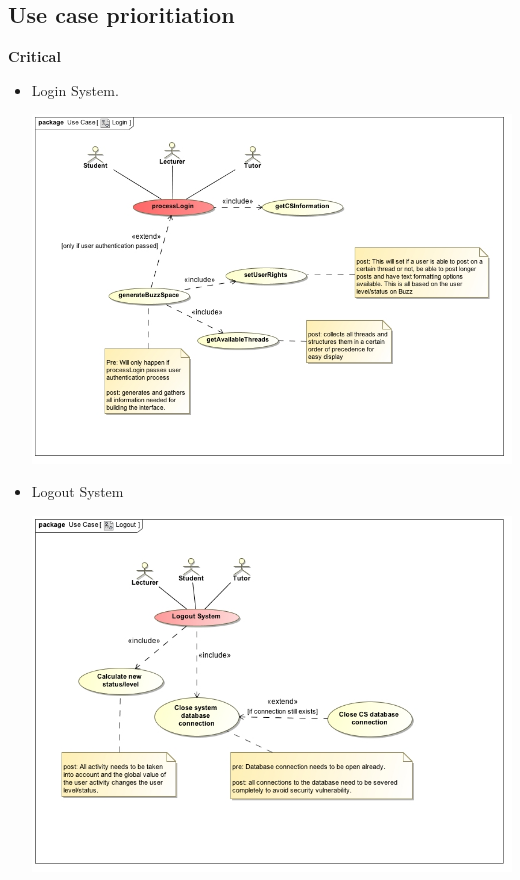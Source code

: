 \documentclass[a4paper,12pt]{report}
\begin{document}
\subsection{Use case prioritiation}
\textbf{Critical} 
\begin{itemize}
  \item Login System.
	\begin{center}
  	\includegraphics[width=1\textwidth]{../Functional_Requirements_DIagrams/UseCases/UseCase_Login.jpg}\\[0.4cm]    
	\end{center}
  \item Logout System
	\begin{center}
  	\includegraphics[width=1\textwidth]{../Functional_Requirements_DIagrams/UseCases/UseCase_Logout.jpg}\\[0.4cm]    

\end{center}
\end{itemize}
\end{document}
